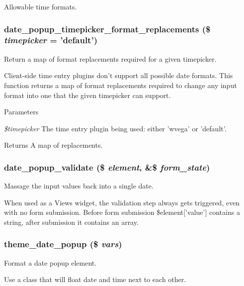 \label{date__popup_8module_ac8083952de3412b9fb7ded7bb98b47e2}
Allowable time formats. \hypertarget{date__popup_8module_a979db45b845f800f2c9f2778d59edf04}{
\subsubsection[{date\_\-popup\_\-timepicker\_\-format\_\-replacements}]{\setlength{\rightskip}{0pt plus 5cm}date\_\-popup\_\-timepicker\_\-format\_\-replacements (\$ {\em timepicker} = {\ttfamily 'default'})}}
\label{date__popup_8module_a979db45b845f800f2c9f2778d59edf04}
Return a map of format replacements required for a given timepicker.

Client-\/side time entry plugins don't support all possible date formats. This function returns a map of format replacements required to change any input format into one that the given timepicker can support.


\begin{DoxyParams}{Parameters}
\item[{\em \$timepicker}]The time entry plugin being used: either 'wvega' or 'default'. \end{DoxyParams}
\begin{DoxyReturn}{Returns}
A map of replacements. 
\end{DoxyReturn}
\hypertarget{date__popup_8module_ae3aefed79afb4cd23b3dc109a4c17bef}{
\subsubsection[{date\_\-popup\_\-validate}]{\setlength{\rightskip}{0pt plus 5cm}date\_\-popup\_\-validate (\$ {\em element}, \/  \&\$ {\em form\_\-state})}}
\label{date__popup_8module_ae3aefed79afb4cd23b3dc109a4c17bef}
Massage the input values back into a single date.

When used as a Views widget, the validation step always gets triggered, even with no form submission. Before form submission \$element\mbox{[}'value'\mbox{]} contains a string, after submission it contains an array. \hypertarget{date__popup_8module_ad97b9e4ee2f4a61297b9de0dab522671}{
\subsubsection[{theme\_\-date\_\-popup}]{\setlength{\rightskip}{0pt plus 5cm}theme\_\-date\_\-popup (\$ {\em vars})}}
\label{date__popup_8module_ad97b9e4ee2f4a61297b9de0dab522671}
Format a date popup element.

Use a class that will float date and time next to each other. 